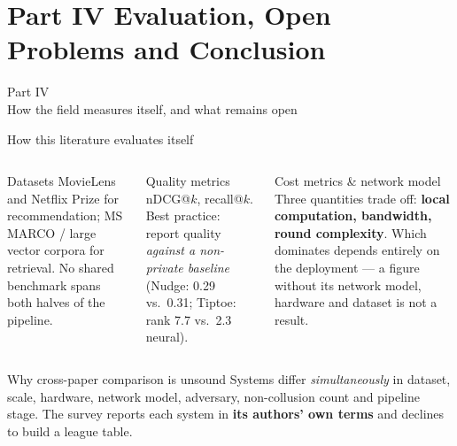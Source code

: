 \documentclass[10pt,aspectratio=169]{beamer}
\begin{document}
\section{Part IV \textbar{} Evaluation, Open Problems and Conclusion}
 
\begin{frame}[standout]
  Part IV\\[0.4em]
  {\normalsize How the field measures itself, and what remains open}
\end{frame}
 
\begin{frame}{How this literature evaluates itself}
  \begin{columns}[T]
    \begin{block}{Datasets}
      \footnotesize MovieLens and Netflix Prize for recommendation;
      MS MARCO / large vector corpora for retrieval. \alert{No shared benchmark}
      spans both halves of the pipeline.
    \end{block}
    \begin{block}{Quality metrics}
      \footnotesize nDCG@$k$, recall@$k$. Best practice: report quality
      \emph{against a non-private baseline} (Nudge: 0.29 vs.\ 0.31; Tiptoe: rank
      7.7 vs.\ 2.3 neural).
    \end{block}
    \begin{block}{Cost metrics \& network model}
      \footnotesize Three quantities trade off: \textbf{local computation, bandwidth,
      round complexity}. Which dominates depends entirely on the deployment ---
      a figure without its network model, hardware and dataset is not a result.
    \end{block}
  \end{columns}
 
  \begin{alertblock}{Why cross-paper comparison is unsound}
    Systems differ \emph{simultaneously} in dataset, scale, hardware, network model,
    adversary, non-collusion count and pipeline stage. The survey reports each system in
    \textbf{its authors' own terms} and declines to build a league table.
  \end{alertblock}
\end{frame}
 
\end{document}
